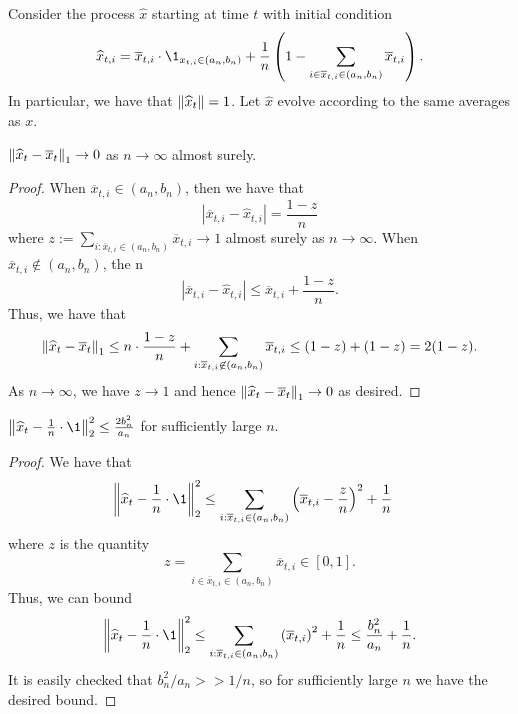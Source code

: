 \documentclass[12pt]{article}
\begin{document}
\begin{defn}
	Consider the process $\widehat{x}$ starting at time $t$ with initial condition
	\[
		\widehat{x}_{t, i} = \overline{x}_{t, i} \cdot \1_{x_{t, i} \in (a_n, b_n)} + \frac{1}{n} \left ( 1 - \sum_{i \in \overline{x}_{t, i} \in (a_n, b_n)} \overline{x}_{t, i} \right ).
	\]
	In particular, we have that $\left\lVert \widehat{x}_t \right\rVert = 1$. Let $\widehat{x}$ evolve according to the same averages as $x$. 
\end{defn}

\begin{lem}
	$\left\lVert \widehat{x}_t - \overline{x}_t \right\rVert_1 \to 0$ as $n \to \infty$ almost surely. 
\end{lem}
\begin{proof}
	When $\overline{x}_{t, i} \in (a_n, b_n)$, then we have that
	\[
		|\overline{x}_{t, i} - \widehat{x}_{t, i}| = \frac{1 - z}{n}
	\]
	where $z := \sum_{i : \overline{x}_{t, i} \in (a_n, b_n)} \overline{x}_{t, i} \to 1$ almost surely as $n \to \infty$. When $\overline{x}_{t, i} \not\in (a_n, b_n)$, the n
	\[
		| \overline{x}_{t,i} - \widehat{x}_{t, i}| \leq \overline{x}_{t, i} + \frac{1-z}{n}.
	\]
	Thus, we have that
	\[
		\left\lVert \widehat{x}_t - \overline{x}_t \right\rVert_1 \leq n \cdot \frac{1-z}{n} + \sum_{i : \overline{x}_{t, i} \not\in (a_n, b_n)} \overline{x}_{t, i} \leq (1-z) + (1 - z) = 2(1-z).
	\]
	As $n \to \infty$, we have $z \to 1$ and hence $\left\lVert \widehat{x}_t - \overline{x}_t \right\rVert_1 \to 0$ as desired. 
\end{proof}
\begin{lem}
	$\norm{\widehat{x}_t - \frac{1}{n} \cdot \1}_2^2 \leq \frac{2b_n^2}{a_n}$ for sufficiently large $n$. 	
\end{lem}

\begin{proof}
	We have that 
	\begin{align*}
		\norm{\widehat{x}_t - \frac{1}{n} \cdot \1}_2^2 & \leq \sum_{i : \overline{x}_{t, i} \in (a_n, b_n)} \left ( \overline{x}_{t, i} - \frac{z}{n} \right )^2 + \frac{1}{n}
	\end{align*}
	where $z$ is the quantity
	\[
		z = \sum_{i \in \overline{x}_{t, i} \in (a_n, b_n)} \overline{x}_{t, i} \in [0, 1].
	\]
	Thus, we can bound 
	\[
		\norm{\widehat{x}_t - \frac{1}{n} \cdot \1}_2^2	\leq \sum_{i : \overline{x}_{t, i} \in (a_n, b_n)} \left ( \overline{x}_{t, i} \right )^2 + \frac{1}{n} \leq \frac{b_n^2}{a_n} + \frac{1}{n}.
	\]
	It is easily checked that $b_n^2 / a_n >> 1/n$, so for sufficiently large $n$ we have the desired bound. 
\end{proof}
\end{document}
